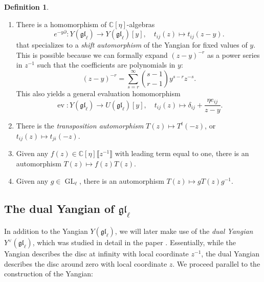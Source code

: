 \documentclass[11pt]{report}
\theoremstyle{definition}
\newtheorem{definition}[theorem]{Definition}
\theoremstyle{remark}
\theoremstyle{remark}
\newcommand{\C}{\mathbb{C}}
\begin{document}
\begin{definition}
\begin{enumerate}[label=(\roman*)]
\item There is a homomorphism of $\C[\eta]$-algebras
\begin{equation*}
e^{-y\partial}: Y(\mathfrak{gl}_\ell) \to Y(\mathfrak{gl}_\ell)[y], \quad t_{ij}(z) \mapsto t_{ij}(z-y).
\end{equation*}
that specializes to a \emph{shift automorphism} of the Yangian for fixed values of $y$. This is possible because we can formally expand $(z-y)^{-r}$ as a power series in $z^{-1}$ such that the coefficients are polynomials in $y$:
\begin{equation*}
(z-y)^{-r} = \sum_{s=r}^\infty {s-1 \choose r-1} y^{s-r} z^{-s}.
\end{equation*}
This also yields a general evaluation homomorphism
\begin{equation*}
\operatorname{ev}: Y(\mathfrak{gl}_\ell) \to U(\mathfrak{gl}_\ell)[y], \quad t_{ij}(z) \mapsto \delta_{ij} + \frac{\eta e_{ij}}{z-y}.
\end{equation*}
\item There is the \emph{transposition automorphism} $T(z) \mapsto T^t(-z)$, or $t_{ij}(z) \mapsto t_{ji}(-z)$.
\item Given any $f(z) \in \C[\eta]\llbracket z^{-1} \rrbracket$ with leading term equal to one, there is an automorphism $T(z) \mapsto f(z) T(z)$.
\item Given any $g \in \operatorname{GL}_\ell$, there is an automorphism $T(z) \mapsto g T(z) g^{-1}$.
\end{enumerate}
\end{definition}

\subsection{The dual Yangian of $\mathfrak{gl}_\ell$}

In addition to the Yangian $Y(\mathfrak{gl}_\ell)$, we will later make use of the \emph{dual Yangian} $Y^\vee(\mathfrak{gl}_\ell)$, which was studied in detail in the paper \cite{article:nazarov:2019}. Essentially, while the Yangian describes the disc at infinity with local coordinate $z^{-1}$, the dual Yangian describes the disc around zero with local coordinate $z$. We proceed parallel to the construction of the Yangian:
\end{document}

